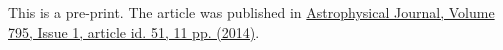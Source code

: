 \LARGE
This is a pre-print. The article was published in \href{http://iopscience.iop.org/article/10.1088/0004-637X/795/1/51/}{Astrophysical Journal, Volume 795, Issue 1, article id. 51, 11 pp. (2014)}.

\normalsize